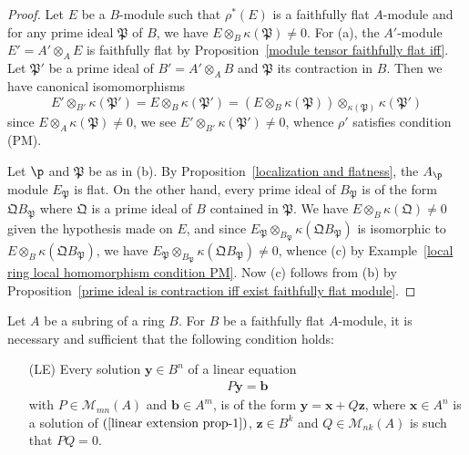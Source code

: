\begin{proof}
Let $E$ be a $B$-module such that $\rho^*(E)$ is a faithfully flat $A$-module and for any prime ideal $\mathfrak{P}$ of $B$, we have $E\otimes_B\kappa(\mathfrak{P})\neq 0$. For (a), the $A'$-module $E'=A'\otimes_AE$ is faithfully flat by Proposition~\ref{module tensor faithfully flat iff}. Let $\mathfrak{P}'$ be a prime ideal of $B'=A'\otimes_AB$ and $\mathfrak{P}$ its contraction in $B$. Then we have canonical isomomorphisms
\[E'\otimes_{B'}\kappa(\mathfrak{P}')=E\otimes_B\kappa(\mathfrak{P}')=(E\otimes_B\kappa(\mathfrak{P}))\otimes_{\kappa(\mathfrak{P})}\kappa(\mathfrak{P}')\]
since $E\otimes_A\kappa(\mathfrak{P})\neq 0$, we see $E'\otimes_{B'}\kappa(\mathfrak{P}')\neq 0$, whence $\rho'$ satisfies condition (PM).\par 
Let $\p$ and $\mathfrak{P}$ be as in (b). By Proposition~\ref{localization and flatness}, the $A_\p$ module $E_\mathfrak{P}$ is flat. On the other hand, every prime ideal of $B_\mathfrak{P}$ is of the form $\mathfrak{Q}B_\mathfrak{P}$ where $\mathfrak{Q}$ is a prime ideal of $B$ contained in $\mathfrak{P}$. We have $E\otimes_B\kappa(\mathfrak{Q})\neq 0$ given the hypothesis made on $E$, and since $E_\mathfrak{P}\otimes_{B_\mathfrak{P}}\kappa(\mathfrak{Q}B_\mathfrak{P})$ is isomorphic to $E\otimes_B\kappa(\mathfrak{Q}B_\mathfrak{P})$, we have $E_\mathfrak{P}\otimes_{B_\mathfrak{P}}\kappa(\mathfrak{Q}B_\mathfrak{P})\neq 0$, whence (c) by Example~\ref{local ring local homomorphism condition PM}. Now (c) follows from (b) by Proposition~\ref{prime ideal is contraction iff exist faithfully flat module}.
\end{proof}
\begin{proposition}\label{module faithfully flat iff linear relation}
Let $A$ be a subring of a ring $B$. For $B$ be a faithfully flat $A$-module, it is necessary and sufficient that the following condition holds:
\begin{enumerate}
\item[(LE)] Every solution $\bm{y}\in B^n$ of a linear equation
\begin{align}\label{linear extension prop-1}
P\bm{y}=\bm{b}
\end{align}
with $P\in\mathcal{M}_{mn}(A)$ and $\bm{b}\in A^m$, is of the form $\bm{y}=\bm{x}+Q\bm{z}$, where $\bm{x}\in A^n$ is a solution of $(\ref{linear extension prop-1})$, $\bm{z}\in B^k$ and $Q\in\mathcal{M}_{nk}(A)$ is such that $PQ=0$.
\end{enumerate}
\end{proposition}

